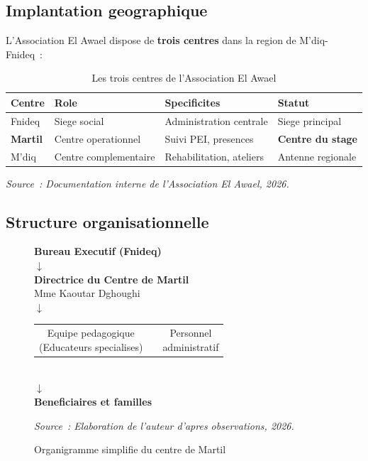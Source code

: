 \documentclass[12pt,a4paper,openany]{report}
\begin{document}
\subsection{Implantation geographique}

L'Association El Awael dispose de \textbf{trois centres} dans la region
de M'diq-Fnideq~:

\begin{table}[H]
\centering
\caption{Les trois centres de l'Association El Awael}
\label{tab:centres}
\begin{tabularx}{\textwidth}{lXXl}
\toprule
\textbf{Centre} & \textbf{Role} & \textbf{Specificites} & \textbf{Statut}\\
\midrule
Fnideq & Siege social & Administration centrale & Siege principal\\
\textbf{Martil} & Centre operationnel & Suivi PEI, presences & \textbf{Centre du stage}\\
M'diq & Centre complementaire & Rehabilitation, ateliers & Antenne regionale\\
\bottomrule
\end{tabularx}
\vspace{0.1cm}
\small\textit{Source~: Documentation interne de l'Association El Awael, 2026.}
\end{table}

\subsection{Structure organisationnelle}

\begin{figure}[H]
\centering
\begin{tcolorbox}[colback=bleuClair!20,colframe=bleu,boxrule=0.8pt,arc=3pt,width=0.9\textwidth]
\centering\small
{\bfseries\color{bleu} Bureau Executif (Fnideq)}\\[0.25cm]
$\downarrow$\\[0.15cm]
{\bfseries Directrice du Centre de Martil}\\
{\small Mme Kaoutar Dghoughi}\\[0.25cm]
$\downarrow$\\[0.15cm]
\begin{tabular}{ccc}
\fbox{\parbox{3cm}{\centering\small Equipe pedagogique\\(Educateurs specialises)}} & \quad &
\fbox{\parbox{3cm}{\centering\small Personnel\\administratif}}
\end{tabular}\\[0.25cm]
$\downarrow$\\[0.15cm]
{\bfseries Beneficiaires et familles}
\end{tcolorbox}
\caption{Organigramme simplifie du centre de Martil}
\label{fig:organigramme}
\small\textit{Source~: Elaboration de l'auteur d'apres observations, 2026.}
\end{figure}
\end{document}
